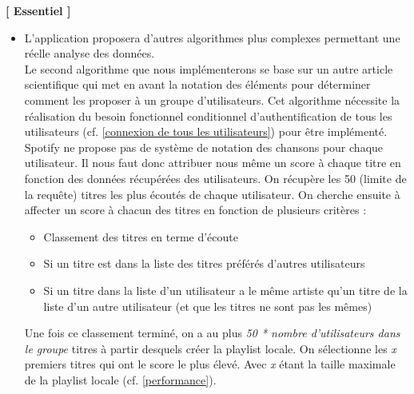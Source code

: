 \documentclass{article}
\begin{document}
		\textbf{[ Essentiel ]}
		\begin{itemize}
			\item  L'application proposera d'autres algorithmes \cite{ICDM2017} plus complexes permettant une réelle analyse des données. \newline \\
			      Le second algorithme que nous implémenterons se base sur un autre article scientifique \cite{Masthof2011} qui met en avant la notation des éléments pour déterminer comment les proposer à un groupe d'utilisateurs. Cet algorithme nécessite la réalisation du besoin fonctionnel conditionnel d'authentification de tous les utilisateurs (cf. \ref{connexion de tous les utilisateurs}) pour être implémenté. \newline
			      Spotify ne propose pas de système de notation des chansons pour chaque utilisateur. Il nous faut donc attribuer nous même un score à chaque titre en fonction des données récupérées des utilisateurs. On récupère les 50 (limite de la requête) titres les plus écoutés de chaque utilisateur. On cherche ensuite à affecter un score à chacun des titres en fonction de plusieurs critères : 
			      \begin{itemize}
			      	\item Classement des titres en terme d'écoute
			      	\item Si un titre est dans la liste des titres préférés d'autres utilisateurs
			      	\item Si un titre dans la liste d'un utilisateur a le même artiste qu'un titre de la liste d'un autre utilisateur (et que les titres ne sont pas les mêmes)
			      \end{itemize}
			      Une fois ce classement terminé, on a au plus \textit{50 * nombre d'utilisateurs dans le groupe} titres à partir desquels créer la playlist locale. On sélectionne les \textit{x} premiers titres qui ont le score le plus élevé. Avec \textit{x} étant la taille maximale de la playlist locale (cf. \ref{performance}).
		\end{itemize}
\end{document}
